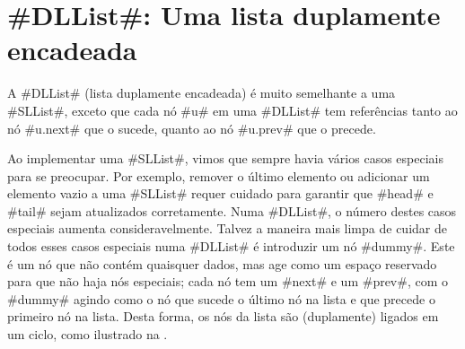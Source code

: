 \section{#DLList#: Uma lista duplamente encadeada}

%
%
%
A #DLList# (lista duplamente encadeada) é muito semelhante a uma #SLList#, exceto que cada nó #u# em uma #DLList# tem referências tanto ao nó #u.next# que o sucede, quanto ao nó #u.prev# que o precede.


Ao implementar uma #SLList#, vimos que sempre havia vários casos especiais para se preocupar. Por exemplo, remover o último elemento ou adicionar um elemento vazio a uma #SLList# requer cuidado para garantir que #head# e #tail# sejam atualizados corretamente. Numa #DLList#, o número destes casos especiais aumenta consideravelmente. Talvez a maneira mais limpa de cuidar de todos esses casos especiais numa #DLList# é introduzir um nó #dummy#.
%
Este é um nó que não contém quaisquer dados, mas age como um espaço reservado para que não haja nós especiais; cada nó tem um #next# e um #prev#, com o #dummy# agindo como o nó que sucede o último nó na lista e que precede o primeiro nó na lista. Desta forma, os nós da lista são (duplamente) ligados em um ciclo, como ilustrado na .


